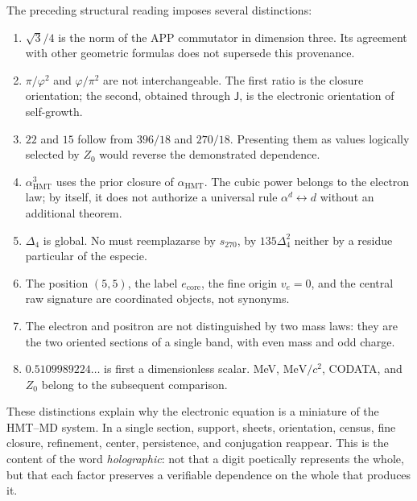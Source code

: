 The preceding structural reading imposes several distinctions:

\begin{enumerate}
\item \(\sqrt3/4\) is the norm of the APP commutator in dimension three. Its
agreement with other geometric formulas does not supersede this provenance.

\item \(\pi/\varphi^2\) and \(\varphi/\pi^2\) are not interchangeable. The
first ratio is the closure orientation; the second, obtained through
\(\mathsf J\), is the electronic orientation of self-growth.

\item \(22\) and \(15\) follow from \(396/18\) and \(270/18\).
Presenting them as values logically selected by \(Z_0\) would reverse
the demonstrated dependence.

\item \(\alpha_{\mathrm{HMT}}^3\) uses the prior closure of
\(\alpha_{\mathrm{HMT}}\). The cubic power belongs to the
electron law; by itself, it does not authorize a universal rule
\(\alpha^d\leftrightarrow d\) without an additional theorem.

\item \(\Delta_4\) is global. No must reemplazarse by
\(s_{270}\), by \(135\Delta_4^2\) neither by a residue particular of the
especie.

\item The position \((5,5)\), the label \(e_{\mathrm{core}}\), the fine
origin \(v_e=0\), and the central raw signature are coordinated objects, not
synonyms.

\item The electron and positron are not distinguished by two mass laws: they are the
two oriented sections of a single band, with even mass and odd charge.

\item \(0.5109989224\ldots\) is first a dimensionless scalar. MeV,
\(\mathrm{MeV}/c^2\), CODATA, and \(Z_0\) belong to the subsequent
comparison.
\end{enumerate}

These distinctions explain why the electronic equation is a
miniature of the HMT--MD system. In a single section, support,
sheets, orientation, census, fine closure, refinement, center, persistence,
and conjugation reappear. This is the content of the word \emph{holographic}: not
that a digit poetically represents the whole, but that each factor
preserves a verifiable dependence on the whole that produces it.
